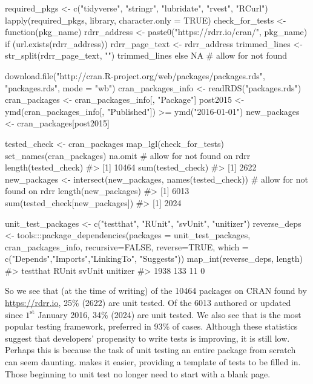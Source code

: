 \begin{example}
required_pkgs <- c("tidyverse", "stringr", "lubridate", "rvest", "RCurl")
lapply(required_pkgs, library, character.only = TRUE)
check_for_tests <- function(pkg_name) {
  rdrr_address <- paste0("https://rdrr.io/cran/", pkg_name)
  if (url.exists(rdrr_address)) {
    rdrr_page_text <- rdrr_address %
    trimmed_lines <- str_split(rdrr_page_text, "\n") %
    trimmed_lines %
  } else {
    NA  # allow for not found
  }
}

download.file("http://cran.R-project.org/web/packages/packages.rds",
              "packages.rds", mode = "wb")
cran_packages_info <- readRDS("packages.rds")
cran_packages <- cran_packages_info[, "Package"]
post2015 <- ymd(cran_packages_info[, "Published"]) >= ymd("2016-01-01")
new_packages <- cran_packages[post2015]

tested_check <- cran_packages %
map_lgl(check_for_tests) %
set_names(cran_packages) %
na.omit  # allow for not found on rdrr
length(tested_check)
#> [1] 10464
sum(tested_check)
#> [1] 2622
new_packages <- intersect(new_packages,
                          names(tested_check))  # allow for not found on rdrr
length(new_packages)
#> [1] 6013
sum(tested_check[new_packages])
#> [1] 2024

unit_test_packages <- c("testthat", "RUnit", "svUnit", "unitizer")
reverse_deps <- tools:::package_dependencies(packages = unit_test_packages,
                          cran_packages_info, recursive=FALSE, reverse=TRUE,
                          which = c("Depends","Imports","LinkingTo", "Suggests"))
map_int(reverse_deps, length)
#> testthat    RUnit   svUnit unitizer
#>     1938      133       11        0
\end{example}
So we see that (at the time of writing) of the 10464 packages on CRAN found by \url{https://rdrr.io}, 25\% (2622) are unit tested. Of the 6013 authored or updated since $1^\text{st}$ January 2016, 34\% (2024) are unit tested. We also see that  is the most popular testing framework, preferred in 93\% of cases.
Although these statistics suggest that developers' propensity to write tests is improving, it is still low. Perhaps this is because the task of unit testing an entire package from scratch can seem daunting.
 makes it easier, providing a template of tests to be filled in. Those beginning to unit test no longer need to start with a blank page.

